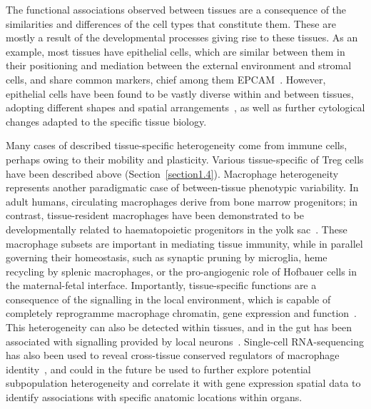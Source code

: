 The functional associations observed between tissues are a consequence of the similarities and differences of the cell types that constitute them. These are mostly a result of the developmental processes giving rise to these tissues. As an example, most tissues have epithelial cells, which are similar between them in their positioning and mediation between the external environment and stromal cells, and share common markers, chief among them EPCAM~\citep{trzpis_epithelial_2007}. However, epithelial cells have been found to be vastly diverse within and between tissues, adopting different shapes and spatial arrangements~\citep{wang_normal_2012}, as well as further cytological changes adapted to the specific tissue biology.

Many cases of described tissue-specific heterogeneity come from immune cells, perhaps owing to their mobility and plasticity. Various tissue-specific of Treg cells have been described above (Section~\ref{section1.4}). Macrophage heterogeneity represents another paradigmatic case of between-tissue phenotypic variability. In adult humans, circulating macrophages derive from bone marrow progenitors; in contrast, tissue-resident macrophages have been demonstrated to be developmentally related to haematopoietic progenitors in the yolk sac~\citep{gomez_perdiguero_tissue-resident_2015}. These macrophage subsets are important in mediating tissue immunity, while in parallel governing their homeostasis, such as synaptic pruning by microglia, heme recycling by splenic macrophages, or the pro-angiogenic role of Hofbauer cells in the maternal-fetal interface. Importantly, tissue-specific functions are a consequence of the signalling in the local environment, which is capable of completely reprogramme macrophage chromatin, gene expression and function~\citep{lavin_tissue-resident_2014,gosselin_environment_2014}. This heterogeneity can also be detected within tissues, and in the gut has been associated with signalling provided by local neurons~\citep{gabanyi_neuro-immune_2016}. Single-cell RNA-sequencing has also been used to reveal cross-tissue conserved regulators of macrophage identity~\citep{scott_transcription_2018}, and could in the future be used to further explore potential subpopulation heterogeneity and correlate it with gene expression spatial data to identify associations with specific anatomic locations within organs.

